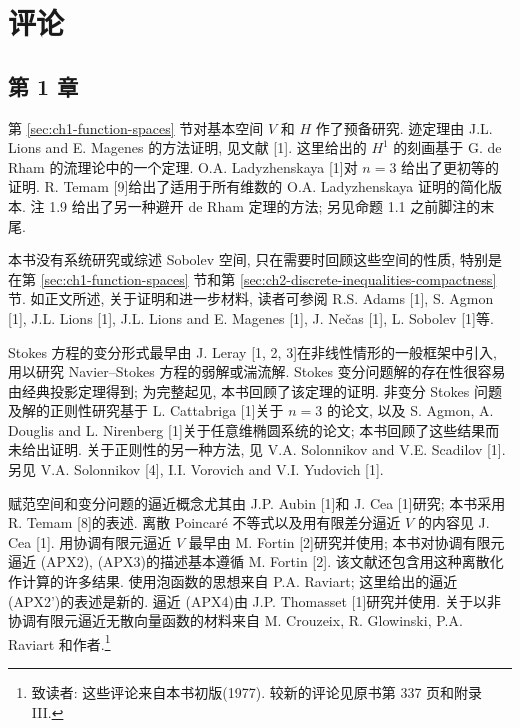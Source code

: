 \clearpage
{}
\section*{评论}
\label{sec:comments}

\hypertarget{comments-page-396}{}
\subsection*{第 1 章}

第 \ref{sec:ch1-function-spaces} 节对基本空间 $V$ 和 $H$ 作了预备研究. 迹定理由 J.L. Lions and E. Magenes 的方法证明, 见文献 [1]. 这里给出的 $H^1$ 的刻画基于 G. de Rham 的流理论中的一个定理. O.A. Ladyzhenskaya [1]对 $n=3$ 给出了更初等的证明. R. Temam [9]给出了适用于所有维数的 O.A. Ladyzhenskaya 证明的简化版本. 注 1.9 给出了另一种避开 de Rham 定理的方法; 另见命题 1.1 之前脚注的末尾.

本书没有系统研究或综述 Sobolev 空间, 只在需要时回顾这些空间的性质, 特别是在第 \ref{sec:ch1-function-spaces} 节和第 \ref{sec:ch2-discrete-inequalities-compactness} 节. 如正文所述, 关于证明和进一步材料, 读者可参阅 R.S. Adams [1], S. Agmon [1], J.L. Lions [1], J.L. Lions and E. Magenes [1], J. Nečas [1], L. Sobolev [1]等.

Stokes 方程的变分形式最早由 J. Leray [1, 2, 3]在非线性情形的一般框架中引入, 用以研究 Navier--Stokes 方程的弱解或湍流解. Stokes 变分问题解的存在性很容易由经典投影定理得到; 为完整起见, 本书回顾了该定理的证明. 非变分 Stokes 问题及解的正则性研究基于 L. Cattabriga [1]关于 $n=3$ 的论文, 以及 S. Agmon, A. Douglis and L. Nirenberg [1]关于任意维椭圆系统的论文; 本书回顾了这些结果而未给出证明. 关于正则性的另一种方法, 见 V.A. Solonnikov and V.E. Scadilov [1]. 另见 V.A. Solonnikov [4], I.I. Vorovich and V.I. Yudovich [1].

赋范空间和变分问题的逼近概念尤其由 J.P. Aubin [1]和 J. Cea [1]研究; 本书采用 R. Temam [8]的表述. 离散 Poincaré 不等式以及用有限差分逼近 $V$ 的内容见 J. Cea [1]. 用协调有限元逼近 $V$ 最早由 M. Fortin [2]研究并使用; 本书对协调有限元逼近 (APX2), (APX3)的描述基本遵循 M. Fortin [2]. 该文献还包含用这种离散化作计算的许多结果. 使用泡函数的思想来自 P.A. Raviart; 这里给出的逼近 (APX2')的表述是新的. 逼近 (APX4)由 J.P. Thomasset [1]研究并使用. 关于以非协调有限元逼近无散向量函数的材料来自 M. Crouzeix, R. Glowinski, P.A. Raviart 和作者.\footnote{致读者: 这些评论来自本书初版(1977). 较新的评论见原书第 337 页和附录 III.}

